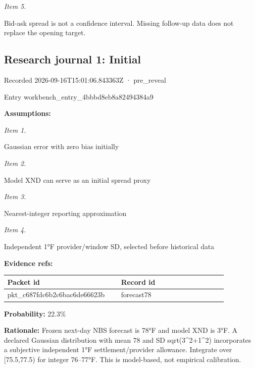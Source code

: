 \documentclass[11pt]{article}
\begin{document}
\par\noindent\textit{Item 5.}\par Bid-ask spread is not a confidence interval. Missing follow-up data does not replace the opening target.

\subsection*{\textcolor{epdarkgreen}{Research journal 1: Initial}}
Recorded 2026-09-16T15:01:06.843363Z · pre\_reveal


Entry workbench\_en\hspace{0pt}try\_4bbbd8eb\hspace{0pt}8a82494384a9


\par\noindent\textbf{Assumptions:} \par \par\noindent\textit{Item 1.}\par Gaussian error with zero bias initially

\par\noindent\textit{Item 2.}\par Model XND can serve as an initial spread proxy

\par\noindent\textit{Item 3.}\par Nearest-integer reporting approximation

\par\noindent\textit{Item 4.}\par Independent 1°F provider/window SD, selected before historical data

\par\noindent\textbf{Evidence refs:} \par \begin{longtable}{>{\raggedright\arraybackslash}p{0.440\linewidth}>{\raggedright\arraybackslash}p{0.440\linewidth}}
Packet id & Record id \\ \hline\endhead
pkt\_c687fdc6b2c6bac6de66623b & forecast78 \\
\end{longtable}

\par\noindent\textbf{Probability:} 22.3\%

\par\noindent\textbf{Rationale:} Frozen next-day NBS forecast is 78°F and model XND is 3°F. A declared Gaussian distribution with mean 78 and SD sqrt(3\textasciicircum{}2+1\textasciicircum{}2) incorporates a subjective independent 1°F settlement/provider allowance. Integrate over [75.5,77.5) for integer 76–77°F. This is model-based, not empirical calibration.
\end{document}
